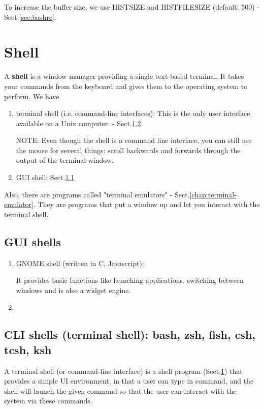 To increase the buffer size, we use HISTSIZE and HISTFILESIZE (default: 500) - Sect.\ref{sec:bashrc}.


\section{Shell}
\label{sec:shell}

A {\bf shell} is a window manager providing a single text-based terminal.
It takes your commands from the keyboard and gives them to the operating system
to perform. We have
\begin{enumerate}
  \item terminal shell (i.e. command-line interfaces): This is the only user
  interface available on a Unix computer. - Sect.\ref{sec:shells-CLI}.

NOTE: Even though the shell is a command line interface, you can still use the
mouse for several things: scroll backwards and forwards through the output of
the terminal window.
  
  \item GUI shell: Sect.\ref{sec:shell-GUI}
\end{enumerate}

Also, there are programs called "terminal emulators" -
Sect.\ref{chap:terminal-emulator}. They are programs that put a window up and
let you interact with the terminal shell.


\subsection{GUI shells}
\label{sec:shell-GUI}

\begin{enumerate}
  \item GNOME shell (written in C, Javascript): %
  
  It provides basic functions like launching applications, switching between
  windows and is also a widget engine.
  
  \item 
\end{enumerate}


\subsection{CLI shells (terminal shell): bash, zsh, fish, csh, tcsh, ksh}
\label{sec:shells-CLI}

A terminal shell (or command-line interface) is a shell program
(Sect.\ref{sec:shell}) that provides a simple UI environment, in that a user can
type in command, and the shell will launch the given command so that the user
can interact with the system via these commands.

